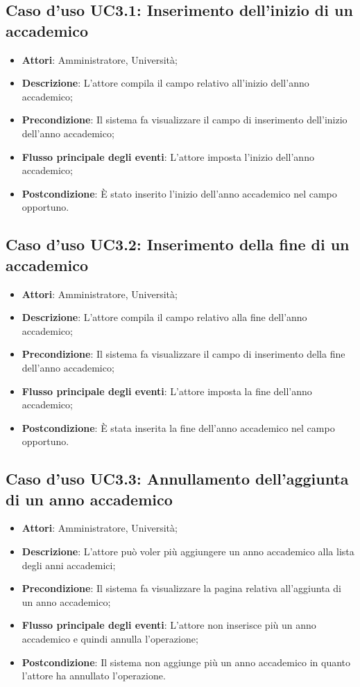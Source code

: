 \subsection{Caso d'uso \texorpdfstring{UC3.1}{UC3.1}: Inserimento dell'inizio di un accademico}
\begin{itemize}
\item \textbf{Attori}: Amministratore, Università;
\item \textbf{Descrizione}: L'attore compila il campo relativo all'inizio dell'anno accademico;
\item \textbf{Precondizione}: Il sistema fa visualizzare il campo di inserimento dell'inizio dell'anno accademico;
\item \textbf{Flusso principale degli eventi}: L'attore imposta l'inizio dell'anno accademico;
\item \textbf{Postcondizione}: È stato inserito l'inizio dell'anno accademico nel campo opportuno.
\end{itemize}
\subsection{Caso d'uso \texorpdfstring{UC3.2}{UC3.2}: Inserimento della fine di un accademico}
\begin{itemize}
\item \textbf{Attori}: Amministratore, Università;
\item \textbf{Descrizione}: L'attore compila il campo relativo alla fine dell'anno accademico;
\item \textbf{Precondizione}: Il sistema fa visualizzare il campo di inserimento della fine dell'anno accademico;
\item \textbf{Flusso principale degli eventi}: L'attore imposta la fine dell'anno accademico;
\item \textbf{Postcondizione}: È stata inserita la fine dell'anno accademico nel campo opportuno.
\end{itemize}
\subsection{Caso d'uso \texorpdfstring{UC3.3}{UC3.3}: Annullamento dell'aggiunta di un anno accademico}
\begin{itemize}
\item \textbf{Attori}: Amministratore, Università;
\item \textbf{Descrizione}: L'attore può voler più aggiungere un anno accademico alla lista degli anni accademici;
\item \textbf{Precondizione}: Il sistema fa visualizzare la pagina relativa all'aggiunta di un anno accademico;
\item \textbf{Flusso principale degli eventi}: L'attore non inserisce più un anno accademico e quindi annulla l'operazione;
\item \textbf{Postcondizione}: Il sistema non aggiunge più un anno accademico in quanto l'attore ha annullato l'operazione.
\end{itemize}
